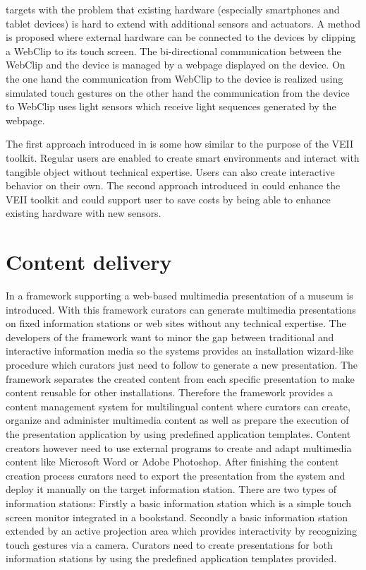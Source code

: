 \cite{Kubitza2013a} targets with the problem that existing hardware (especially smartphones and tablet devices) is hard to extend with additional sensors and actuators. A method is proposed where external hardware can be connected to the devices by clipping a WebClip to its touch screen. The bi-directional communication between the WebClip and the device is managed by a webpage displayed on the device. On the one hand the communication from WebClip to the device is realized using simulated touch gestures on the other hand the communication from the device to WebClip uses light sensors which receive light sequences generated by the webpage.

The first approach introduced in \cite{Benavides2014} is some how similar to the purpose of the VEII toolkit. Regular users are enabled to create smart environments and interact with tangible object without technical expertise. Users can also create interactive behavior on their own. The second approach introduced in \cite{Kubitza2013a} could enhance the VEII toolkit and could support user to save costs by being able to enhance existing hardware with new sensors.

\section{Content delivery}
In \cite{Styliaras2007} a framework supporting a web-based multimedia presentation of a museum is introduced. With this framework curators can generate multimedia presentations on fixed information stations or web sites without any technical expertise. The developers of the framework want to minor the gap between traditional and interactive information media so the systems provides an installation wizard-like procedure which curators just need to follow to generate a new presentation. The framework separates the created content from each specific presentation to make content reusable for other installations. Therefore the framework provides a content management system for multilingual content where curators can create, organize and administer multimedia content as well as prepare the execution of the presentation application by using predefined application templates. Content creators however need to use external programs to create and adapt multimedia content like Microsoft Word or Adobe Photoshop. After finishing the content creation process curators need to export the presentation from the system and deploy it manually on the target information station. There are two types of information stations: Firstly a basic information station which is a simple touch screen monitor integrated in a bookstand. Secondly a basic information station extended by an active projection area which provides interactivity by recognizing touch gestures via a camera. Curators need to create presentations for both information stations by using the predefined application templates provided.

